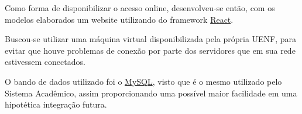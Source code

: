     Como forma de disponibilizar o acesso online, desenvolveu-se então, com os modelos elaborados um website utilizando do framework \href{https://react.dev/}{React}.

    Buscou-se utilizar uma máquina virtual disponibilizada pela própria UENF, para evitar que houve problemas de conexão por parte dos servidores que em sua rede estivessem conectados.

    O bando de dados utilizado foi o \href{https://dev.mysql.com/}{MySQL}, visto que é o mesmo utilizado pelo Sistema Acadêmico, assim proporcionando uma possível maior facilidade em uma hipotética integração futura.

